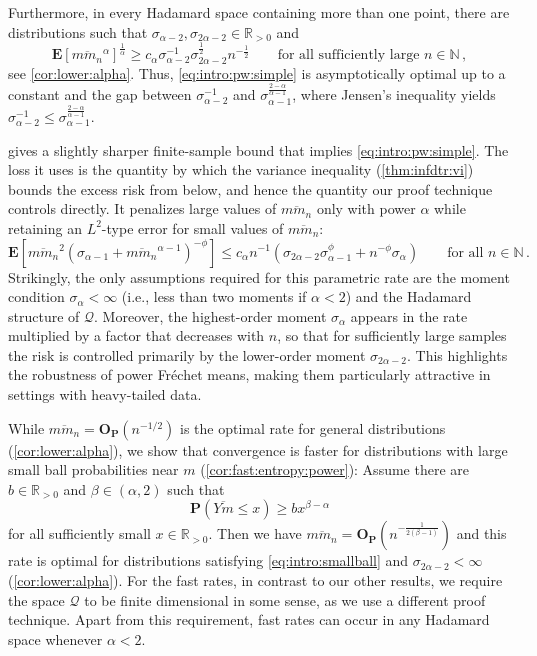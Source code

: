 \documentclass{article}
\newcommand*{\mc}[1]{\mathcal{#1}}
\newcommand{\N}{\mathbb{N}}
\newcommand{\R}{\mathbb{R}}
\newcommand{\Rpp}{\R_{>0}}
\newcommand{\lab}{\left[} %
\newcommand{\rab}{\right]} %
\newcommand{\ab}[1]{\lab #1 \rab} %
\newcommand{\abOf}[1]{\!\ab{#1}} %
\newcommand{\lb}{\left(} %
\newcommand{\rb}{\right)} %
\newcommand{\br}[1]{\lb #1 \rb} %
\newcommand{\brOf}[1]{\!\br{#1}} %
\renewcommand{\Pr}{\mathbf{P}} %
\newcommand{\PrOf}[1]{\Pr\brOf{#1}}
\newcommand{\E}{\mathbf{E}} %
\newcommand{\EOf}[1]{\E\abOf{#1}}
\newcommand{\eqcm}{\,,} %
\newcommand{\eqfs}{\,.}
\newcommand{\ol}[2]{\overline{#1#2}}
\newcommand{\Op}{\mathbf{O}_{\Pr}}
\begin{document}
Furthermore, in every Hadamard space containing more than one point, there are distributions such that $\sigma_{\alpha-2}, \sigma_{2\alpha-2} \in \Rpp$ and
\begin{equation}
    \EOf{\ol m{m_n}^{\alpha}}^{\frac1\alpha}
    \geq 
    c_\alpha \sigma_{\alpha-2}^{-1} \sigma_{2\alpha-2}^{\frac12}  n^{-\frac12}
    \qquad
    \text{for all sufficiently large } n\in\N
    \eqcm
\end{equation}
see \cref{cor:lower:alpha}.
Thus, \eqref{eq:intro:pw:simple} is asymptotically optimal up to a constant and the gap between $\sigma_{\alpha-2}^{-1}$ and $\sigma_{\alpha-1}^{\frac{2-\alpha}{\alpha-1}}$, where Jensen's inequality yields $\sigma_{\alpha-2}^{-1} \leq \sigma_{\alpha-1}^{\frac{2-\alpha}{\alpha-1}}$.

 gives a slightly sharper finite-sample bound that implies
\eqref{eq:intro:pw:simple}. The loss it uses is the quantity by which the variance inequality (\cref{thm:infdtr:vi})
bounds the excess risk from below, and hence the quantity our proof technique
controls directly. It penalizes large values of $\ol m{m_n}$ only with power
$\alpha$ while retaining an $L^2$-type error for small values of $\ol m{m_n}$:
\begin{equation}
	\EOf{\ol m{m_n}^2 \br{\sigma_{\alpha-1} + \ol m{m_n}^{\alpha-1}}^{-\phi}}
	\leq
	c_\alpha n^{-1} \br{\sigma_{2\alpha-2}	\sigma_{\alpha-1}^{\phi} + n^{-\phi}\sigma_{\alpha}}
    \qquad\text{for all } n\in\N
    \eqfs
\end{equation}
Strikingly, the only assumptions required for this parametric rate are the moment condition $\sigma_\alpha < \infty$ (i.e., less than two moments if $\alpha<2$) and the Hadamard structure of $\mc Q$. Moreover, the highest-order moment $\sigma_\alpha$ appears in the rate multiplied by a factor that decreases with $n$, so that for sufficiently large samples the risk is controlled primarily by the lower-order moment $\sigma_{2\alpha-2}$. This highlights the robustness of power Fr\'echet means, making them particularly attractive in settings with heavy-tailed data.

While $\ol{m}{m_n} = \Op(n^{-1/2})$ is the optimal rate for general distributions (\cref{cor:lower:alpha}), we show that convergence is faster for distributions with large small ball probabilities near $m$ (\cref{cor:fast:entropy:power}): Assume there are $b\in\Rpp$ and $\beta \in (\alpha, 2)$ such that 
\begin{equation}\label{eq:intro:smallball}
    \PrOf{\ol Ym \leq x} \geq b x^{\beta-\alpha}
\end{equation}
for all sufficiently small $x\in\Rpp$. Then we have $\ol{m}{m_n} = \Op(n^{-\frac{1}{2(\beta-1)}})$ and this rate is optimal for distributions satisfying \eqref{eq:intro:smallball} and $\sigma_{2\alpha-2} < \infty$ (\cref{cor:lower:alpha}). For the fast rates, in contrast to our other results, we require the space $\mc Q$ to be finite dimensional in some sense, as we use a different proof technique. Apart from this requirement, fast rates can occur in any Hadamard space whenever $\alpha<2$.
%
%
%
\end{document}
